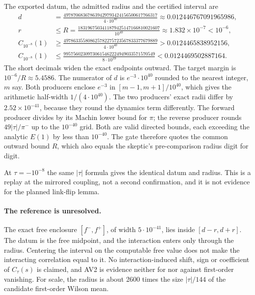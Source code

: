 The exported datum, the admitted radius and the certified interval are
\begin{align}
 d&=\frac{497870683678639429793424156500617766317}{4\cdot10^{40}}
 \approx0.012446767091965986,\label{eq:av2-datum}\\
 r&\le R=\frac{1831967503411879425147166810021607}{10^{40}}
 \approx1.832\times10^{-7}<10^{-6},\label{eq:av2-radius}\\
 C_{10^{-8}}(1)&\ge\frac{497863355808625782275723567833377679889}{4\cdot10^{40}}
 >0.0124465838952156,\label{eq:av2-lower}\\
 C_{10^{-8}}(1)&\le\frac{99575602309730615462224949033571570549}{8\cdot10^{39}}
 <0.0124469502887164.\label{eq:av2-upper}
\end{align}
The short decimals widen the exact endpoints outward. The target margin is
$10^{-6}/R\approx5.4586$. The numerator of $d$ is $e^{-3}\cdot10^{40}$ rounded
to the nearest integer, $m$ say. Both producers enclose $e^{-3}$ in
$[m-1,m+1]/10^{40}$, which gives the arithmetic half-width $1/(4\cdot10^{40})$.
The two producers' exact radii differ by $2.52\times10^{-41}$, because they
round the dynamics term differently. The forward producer divides by its
Machin lower bound for $\pi$; the reverse producer rounds $49|\tau|/\pi^-$ up
to the $10^{-40}$ grid. Both are valid directed bounds, each exceeding the
analytic $E(1)$ by less than $10^{-40}$. The gate therefore quotes the common
outward bound $R$, which also equals the skeptic's pre-comparison radius digit
for digit.

At $\tau=-10^{-8}$ the same $|\tau|$ formula gives the identical datum and
radius. This is a replay at the mirrored coupling, not a second confirmation,
and it is not evidence for the planned link-flip lemma.

\paragraph{The reference is unresolved.}
The exact free enclosure $[f^-,f^+]$, of width $5\cdot10^{-41}$, lies inside
$[d-r,d+r]$. The datum is the free midpoint, and the interaction enters only
through the radius. Centering the interval on the computable free value does
not make the interacting correlation equal to it. No interaction-induced
shift, sign or coefficient of $C_\tau(s)$ is claimed, and AV2 is evidence
neither for nor against first-order vanishing. For scale, the radius is about
2600 times the size $|\tau|/144$ of the candidate first-order Wilson mean.

